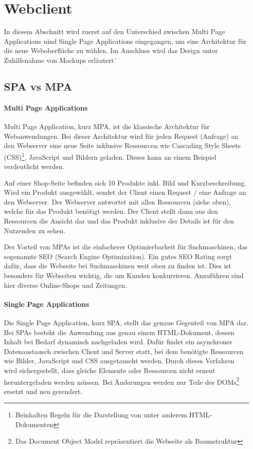 \section{Webclient} \label{sec:Webclient}
In diesem Abschnitt wird zuerst auf den Unterschied zwischen Multi Page Applications uind Single Page Applications eingegangen, um eine Architektur für die neue Weboberfläche zu wählen. Im Anschluss wird das Design unter Zuhilfenahme von Mockups erläutert´

\subsection{SPA vs MPA} \label{subsec:SPA_vs_MPA}

\paragraph{Multi Page Applications} \label{para:Multi_Page_Applications}
Multi Page Application, kurz MPA, ist die klassische Architektur für Webanwendungen. Bei dieser Architektur wird für jeden Request (Anfrage) an den Webserver eine neue Seite inklusive Ressourcen wie Cascading Style Sheets (CSS)\footnote{Beinhalten Regeln für die Darstellung von unter anderem HTML-Dokumenten}, JavaScript und Bildern geladen. Dieses kann an einem Beispiel verdeutlicht werden.

Auf einer Shop-Seite befinden sich 10 Produkte inkl. Bild und Kurzbeschreibung. Wird ein Produkt ausgewählt, sendet der Client einen Request / eine Anfrage an den Webserver. Der Webserver antwortet mit allen Ressourcen (siehe oben), welche für das Produkt benötigt werden. Der Client stellt dann aus den Ressourcen die Ansicht dar und das Produkt inklusive der Details ist für den Nutzenden zu sehen.

Der Vorteil von MPAs ist die einfacherer Optimierbarkeit für Suchmaschinen, das sogenannte SEO (Search Engine Optimization). Ein gutes SEO Rating sorgt dafür, dass die Webseite bei Suchmaschinen weit oben zu finden ist. Dies ist besonders für Webseiten wichtig, die um Kunden konkurrieren. Anzuführen sind hier diverse Online-Shops und Zeitungen.

\paragraph{Single Page Applications} \label{para:Single_Page_Applications}
Die Single Page Application, kurz SPA, stellt das genaue Gegenteil von MPA dar. Bei SPAs besteht die Anwendung aus genau einem HTML-Dokument, dessen Inhalt bei Bedarf dynamisch nachgeladen wird. Dafür findet ein asynchroner Datenaustausch zwischen Client und Server statt, bei dem benötigte Ressourcen wie Bilder, JavaScript und CSS ausgetauscht werden. Durch dieses Verfahren wird sichergestellt, dass gleiche Elemente oder Ressourcen nicht erneut heruntergeladen werden müssen. Bei Änderungen werden nur Teile des DOMs\footnote{Das Document Object Model repräsentiert die Webseite als Baumstruktur} ersetzt und neu gerendert.

